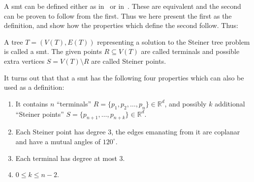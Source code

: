 A \ac{smt} can be defined either as in~\textcite{brazil2015} or
in~\textcite{smith1992}. These are equivalent and the second can be proven
to follow from the first. Thus we here present the first as the definition, and
show how the properties which define the second follow. Thus:
%
\begin{definition}
  A tree $T = (V(T), E(T))$ representing a solution to the Steiner tree problem
  is called a \acl{smt}. The given points $R \subseteq V(T)$ are called
  terminals and possible extra vertices $S = V(T) \setminus R$ are called
  Steiner points.
\end{definition}
%
It turns out that that a \ac{smt} has the following four properties which can
also be used as a definition:
%
\begin{definition}
\leavevmode\vspace{-\baselineskip}\par
\begin{enumerate}
\item It contains $n$ ``terminals'' $R = \{ p_1, p_2, \ldots, p_n \} \in \mathbb{R}^d$, and
 possibly $k$ additional ``Steiner points'' $S = \{ p_{n+1}, \ldots, p_{n+k} \} \in \mathbb{R}^d$.
\item Each Steiner point has degree $3$, the edges emanating from it are
  coplanar and have a mutual angles of $120^{\circ}$.
\item Each terminal has degree at most $3$.
\item $0 \le k \le n-2$.
\end{enumerate}
\end{definition}
%
